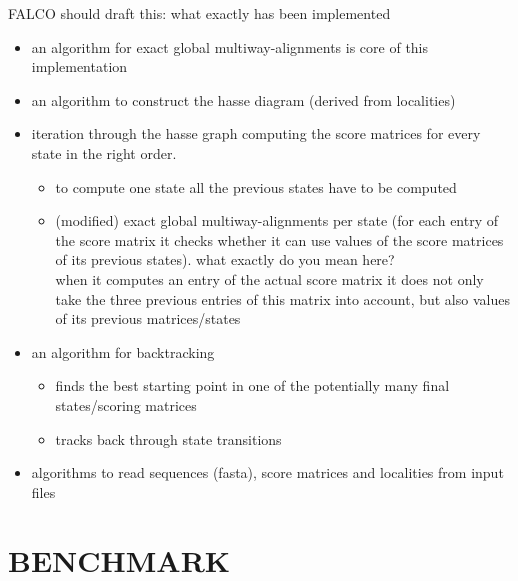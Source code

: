 \documentclass[a4paper,10pt]{article}
\newcommand{\TODO}[1]{\begingroup\color{red}#1\endgroup}
\newcommand{\FK}[1]{\begingroup\color{blue}#1\endgroup}
\begin{document}
\TODO{FALCO should draft this: what exactly has been implemented} 
\FK{
\begin{itemize}
    \item an algorithm for exact global multiway-alignments is core of this implementation
    \item an algorithm to construct the hasse diagram (derived from localities)
    \item iteration through the hasse graph computing the score matrices for every state in the right order. 
    \begin{itemize}
        \item to compute one state all the previous states have to be computed
        \item (modified) exact global multiway-alignments per state (for
          each entry of the score matrix it checks whether it can use
          values of the score matrices of its previous states).
          \TODO{what exactly do you mean here?} \\
          when it computes an entry of the actual score matrix it does not only take the three previous entries of this matrix into account, but also values of its previous matrices/states
    \end{itemize}
    \item an algorithm for backtracking
    \begin{itemize}
        \item finds the best starting point in one of the potentially many final states/scoring matrices
        \item tracks back through state transitions 
    \end{itemize}
    \item algorithms to read sequences (fasta), score matrices and localities from input files
\end{itemize}
}

\section{\uppercase{Benchmark}}

\end{document}

